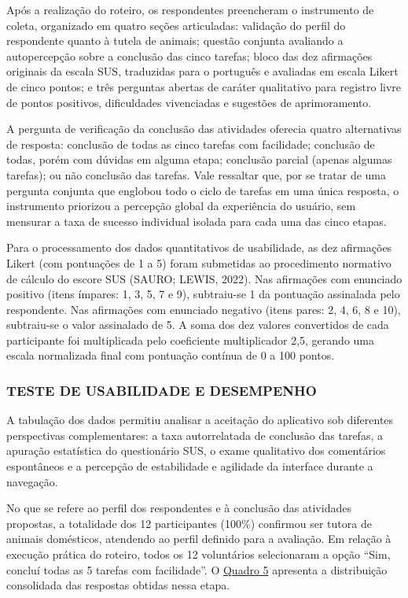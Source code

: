Após a realização do roteiro, os respondentes preencheram o instrumento de coleta, organizado em quatro seções articuladas: validação do perfil do respondente quanto à tutela de animais; questão conjunta avaliando a autopercepção sobre a conclusão das cinco tarefas; bloco das dez afirmações originais da escala SUS, traduzidas para o português e avaliadas em escala Likert de cinco pontos; e três perguntas abertas de caráter qualitativo para registro livre de pontos positivos, dificuldades vivenciadas e sugestões de aprimoramento.

A pergunta de verificação da conclusão das atividades oferecia quatro alternativas de resposta: conclusão de todas as cinco tarefas com facilidade; conclusão de todas, porém com dúvidas em alguma etapa; conclusão parcial (apenas algumas tarefas); ou não conclusão das tarefas. Vale ressaltar que, por se tratar de uma pergunta conjunta que englobou todo o ciclo de tarefas em uma única resposta, o instrumento priorizou a percepção global da experiência do usuário, sem mensurar a taxa de sucesso individual isolada para cada uma das cinco etapas.

Para o processamento dos dados quantitativos de usabilidade, as dez afirmações Likert (com pontuações de 1 a 5) foram submetidas ao procedimento normativo de cálculo do escore SUS (SAURO; LEWIS, 2022). Nas afirmações com enunciado positivo (itens ímpares: 1, 3, 5, 7 e 9), subtraiu-se 1 da pontuação assinalada pelo respondente. Nas afirmações com enunciado negativo (itens pares: 2, 4, 6, 8 e 10), subtraiu-se o valor assinalado de 5. A soma dos dez valores convertidos de cada participante foi multiplicada pelo coeficiente multiplicador 2,5, gerando uma escala normalizada final com pontuação contínua de 0 a 100 pontos.

\subsubsection{TESTE DE USABILIDADE E DESEMPENHO}

A tabulação dos dados permitiu analisar a aceitação do aplicativo sob diferentes perspectivas complementares: a taxa autorrelatada de conclusão das tarefas, a apuração estatística do questionário SUS, o exame qualitativo dos comentários espontâneos e a percepção de estabilidade e agilidade da interface durante a navegação.

No que se refere ao perfil dos respondentes e à conclusão das atividades propostas, a totalidade dos 12 participantes (100\%) confirmou ser tutora de animais domésticos, atendendo ao perfil definido para a avaliação. Em relação à execução prática do roteiro, todos os 12 voluntários selecionaram a opção ``Sim, concluí todas as 5 tarefas com facilidade''. O \hyperref[quadro:conclusao_tarefas]{Quadro 5} apresenta a distribuição consolidada das respostas obtidas nessa etapa.

